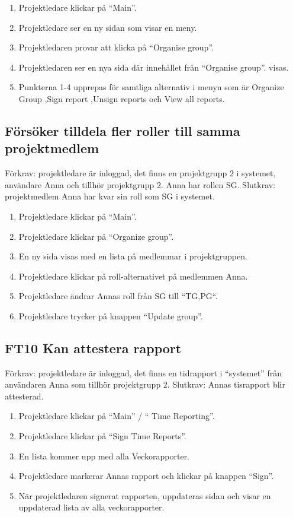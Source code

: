 \documentclass[paper=a4, fontsize=11pt,twoside]{article}
\begin{document}
	\begin{enumerate}
	  \item Projektledare klickar på “Main”.
	  \item Projektledare ser en ny sidan som visar en meny.
	  \item Projektledaren provar att klicka på “Organise group”.
      \item Projektledaren ser en nya sida där innehållet från “Organise group”.
      visas. 
      \item Punkterna 1-4 upprepas för samtliga alternativ i menyn som är
      Organize Group ,Sign report ,Unsign reports och View all reports.
	\end{enumerate}
	
	\subsection*{Försöker tilldela fler roller till samma projektmedlem}
	
	Förkrav: projektledare är inloggad, det finns en projektgrupp 2 i systemet,
	användare  Anna och tillhör projektgrupp 2. Anna har rollen SG.
	\newline
	Slutkrav: projektmedlem Anna har kvar sin roll som SG i systemet.
	
	\begin{enumerate}
	 \item Projektledare klickar på “Main”.
	\item Projektledare klickar på “Organize group”.
	\item En ny sida visas med en lista på medlemmar i projektgruppen.
	\item Projektledare klickar på roll-alternativet på medlemmen Anna.
	\item Projektledare ändrar Annas roll från SG till “TG,PG“.
	\item Projektledare trycker på knappen “Update group”.

	  
	\end{enumerate}

	\subsection*{FT10 Kan attestera rapport}
		Förkrav: projektledare är inloggad, det finns en tidrapport i “systemet” från användaren  Anna som tillhör projektgrupp 2. 
		\newline
		Slutkrav: Annas tisrapport blir attesterad.
		
		\begin{enumerate}
		  \item Projektledare klickar på “Main” / “ Time Reporting”.
		  \item Projektledare klickar på “Sign Time Reports”.
		  \item En lista kommer upp med alla Veckorapporter.
		  \item Projektledare  markerar Annas rapport och klickar på knappen “Sign”.
		  \item När projektledaren signerat rapporten, uppdateras sidan och visar en
	uppdaterad lista av alla veckorapporter.
		  
		\end{enumerate}
		
\end{document}
